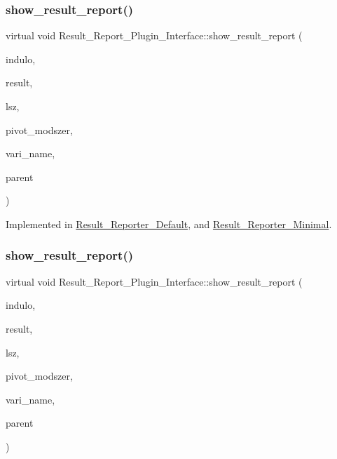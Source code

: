 \subsubsection{\texorpdfstring{show\+\_\+result\+\_\+report()}{show\_result\_report()}\hspace{0.1cm}{\footnotesize\ttfamily [1/3]}}
{\footnotesize\ttfamily virtual void Result\+\_\+\+Report\+\_\+\+Plugin\+\_\+\+Interface\+::show\+\_\+result\+\_\+report (\begin{DoxyParamCaption}\item[{Q\+Standard\+Item\+Model $\ast$}]{indulo,  }\item[{Q\+Standard\+Item\+Model $\ast$}]{result,  }\item[{int}]{lsz,  }\item[{Q\+String}]{pivot\+\_\+modszer,  }\item[{Q\+String}]{vari\+\_\+name,  }\item[{Q\+Widget $\ast$}]{parent }\end{DoxyParamCaption})\hspace{0.3cm}{\ttfamily [pure virtual]}}



Implemented in \hyperlink{classResult__Reporter__Default_a0cd7068847fcea1f0f4a6ba82441c4c6}{Result\+\_\+\+Reporter\+\_\+\+Default}, and \hyperlink{classResult__Reporter__Minimal_af40ff386283122012cf55bf9c415fa71}{Result\+\_\+\+Reporter\+\_\+\+Minimal}.

\mbox{\label{classResult__Report__Plugin__Interface_a7dc45f2c25e0f4f4f99b2d7cd1799aa0}} 
\subsubsection{\texorpdfstring{show\+\_\+result\+\_\+report()}{show\_result\_report()}\hspace{0.1cm}{\footnotesize\ttfamily [2/3]}}
{\footnotesize\ttfamily virtual void Result\+\_\+\+Report\+\_\+\+Plugin\+\_\+\+Interface\+::show\+\_\+result\+\_\+report (\begin{DoxyParamCaption}\item[{Q\+Standard\+Item\+Model $\ast$}]{indulo,  }\item[{Q\+Standard\+Item\+Model $\ast$}]{result,  }\item[{int}]{lsz,  }\item[{Q\+String}]{pivot\+\_\+modszer,  }\item[{Q\+String}]{vari\+\_\+name,  }\item[{Q\+Widget $\ast$}]{parent }\end{DoxyParamCaption})\hspace{0.3cm}{\ttfamily [pure virtual]}}



